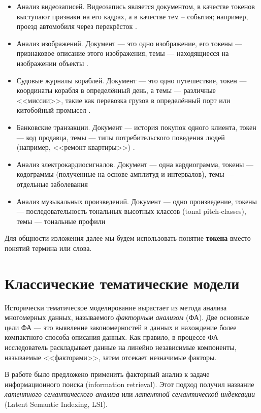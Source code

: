 \begin{itemize}
    \item Анализ видеозаписей. Видеозапись является документом, в качестве токенов выступают признаки на его кадрах, а в качестве тем – события; например, проезд автомобиля через перекрёсток \cite{sparse}.
    \item Анализ изображений. Документ --- это одно изображение, его токены --- признаковое описание этого изображения, темы --- находящиесся на изображении объекты \cite{mml1}.
    \item Судовые журналы кораблей. Документ --- это одно путешествие, токен --- координаты корабля в определённый день, а темы --- различные <<миссии>>, такие как перевозка грузов в определённый порт или китобойный промысел \cite{dh_sea}.
    \item Банковские транзакции. Документ --- история покупок одного клиента, токен --- код продавца, темы --- типы потребительского поведения людей (например, <<ремонт квартиры>>) \cite{egorov2019topic}.
    \item Анализ электрокардиосигналов. Документ --- одна кардиограмма, токены --- кодограммы (полученные на основе амплитуд и интервалов), темы --- отдельные заболевания \cite{shapulin}
    \item Анализ музыкальных произведений. Документ --- одно произведение, токены --- последовательность тональных высотных классов (tonal pitch-classes), темы --- тональные профили \cite{moss2019transitions}
\end{itemize}

Для общности изложения далее мы будем использовать понятие \textbf{токена} вместо понятий термина или слова.

\section{Классические тематические модели}

Исторически тематическое моделирование вырастает из метода анализа многомерных данных, называемого \textit{факторным анализом} (ФА). Две основные цели ФА --- это выявление закономерностей в данных и нахождение более компактного способа описания данных. Как правило, в процессе ФА исследователь раскладывает данные на линейно независимые компоненты, называемые <<факторами>>, затем отсекает незначимые  факторы.

В работе \cite{deerwester1990indexing} было предложено применить факторный анализ к задаче информационного поиска (information retrieval). Этот подход получил название \textit{латентного семантического анализа} или \textit{латентной семантической индексации} (Latent Semantic Indexing, LSI).

